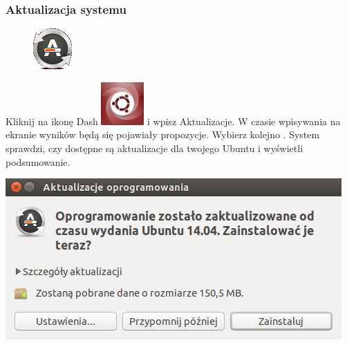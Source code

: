 \subsubsection{Aktualizacja systemu}
\label{rzeczy_do_zrobienia_po_instalacji}
\begin{figure}
        \includegraphics[width=\linewidth]{images/pierwsze_uruchomienie_aktualizacja1.png}
\end{figure}

Kliknij na ikonę Dash \includegraphics[scale=0.35]{images/ikony_dash.png} i wpisz \textcolor{ubuntu_orange}{Aktualizacje}. W czasie wpisywania na ekranie wyników będą się pojawiały propozycje. Wybierz kolejno .
System sprawdzi, czy dostępne są aktualizacje dla twojego Ubuntu i wyświetli podsumowanie.
\begin{center}
        \includegraphics{images/pierwsze_uruchomienie_aktualizacja2.png}
\end{center}

